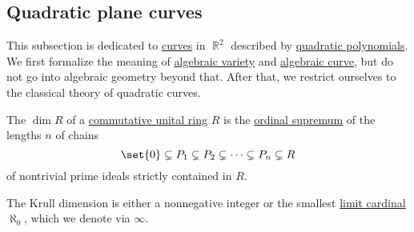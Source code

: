 \subsection{Quadratic plane curves}\label{subsec:quadratic_plane_curves}

This subsection is dedicated to \hyperref[def:parametric_curve]{curves} in \( \BbbR^2 \) described by \hyperref[def:polynomial_degree]{quadratic polynomials}. We first formalize the meaning of \hyperref[def:affine_algebraic_set/variety]{algebraic variety} and \hyperref[def:affine_algebraic_set/curve]{algebraic curve}, but do not go into algebraic geometry beyond that. After that, we restrict ourselves to the classical theory of quadratic curves.

\begin{definition}\label{def:krull_dimension}
  The  \( \dim R \) of a \hyperref[def:ring/commutative]{commutative unital ring} \( R \) is the \hyperref[thm:union_of_set_of_ordinals/supremum]{ordinal supremum} of the lengths \( n \) of chains
  \begin{equation*}
    \set{ 0 } \subsetneq P_1 \subsetneq P_2 \subsetneq \cdots \subsetneq P_n \subsetneq R
  \end{equation*}
  of nontrivial prime ideals strictly contained in \( R \).

  The Krull dimension is either a nonnegative integer or the smallest \hyperref[def:successor_and_limit_cardinal/weak_limit]{limit cardinal} \( \aleph_0 \), which we denote via \( \infty \).
\end{definition}

